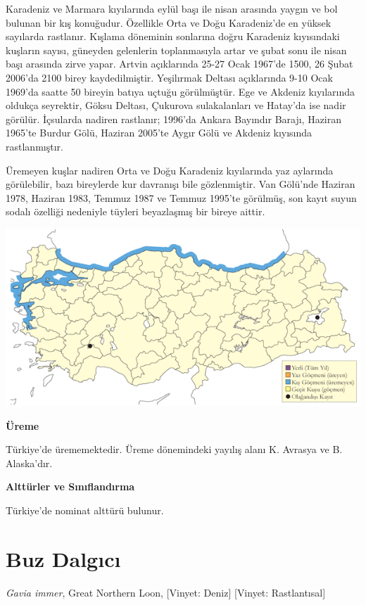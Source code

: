 \documentclass[
  letterpaper,
  DIV=11,
  numbers=noendperiod]{scrreprt}
\begin{document}
Karadeniz ve Marmara kıyılarında eylül başı ile nisan arasında yaygın ve
bol bulunan bir kış konuğudur. Özellikle Orta ve Doğu Karadeniz'de en
yüksek sayılarda rastlanır. Kışlama döneminin sonlarına doğru Karadeniz
kıyısındaki kuşların sayısı, güneyden gelenlerin toplanmasıyla artar ve
şubat sonu ile nisan başı arasında zirve yapar. Artvin açıklarında 25-27
Ocak 1967'de 1500, 26 Şubat 2006'da 2100 birey kaydedilmiştir.
Yeşilırmak Deltası açıklarında 9-10 Ocak 1969'da saatte 50 bireyin
batıya uçtuğu görülmüştür. Ege ve Akdeniz kıyılarında oldukça seyrektir,
Göksu Deltası, Çukurova sulakalanları ve Hatay'da ise nadir görülür.
İçsularda nadiren rastlanır; 1996'da Ankara Bayındır Barajı, Haziran
1965'te Burdur Gölü, Haziran 2005'te Aygır Gölü ve Akdeniz kıyısında
rastlanmıştır.

Üremeyen kuşlar nadiren Orta ve Doğu Karadeniz kıyılarında yaz aylarında
görülebilir, bazı bireylerde kur davranışı bile gözlenmiştir. Van
Gölü'nde Haziran 1978, Haziran 1983, Temmuz 1987 ve Temmuz 1995'te
görülmüş, son kayıt suyun sodalı özelliği nedeniyle tüyleri beyazlaşmış
bir bireye aittir.

\includegraphics{images/harita_Page_046.png}

\textbf{Üreme}

Türkiye'de ürememektedir. Üreme dönemindeki yayılış alanı K. Avrasya ve
B. Alaska'dır.

\textbf{Alttürler ve Sınıflandırma}

Türkiye'de nominat alttürü bulunur.

\section{Buz Dalgıcı}\label{buz-dalgux131cux131}

\emph{Gavia immer}, Great Northern Loon, {[}Vinyet: Deniz{]} {[}Vinyet:
Rastlantısal{]}
\end{document}
